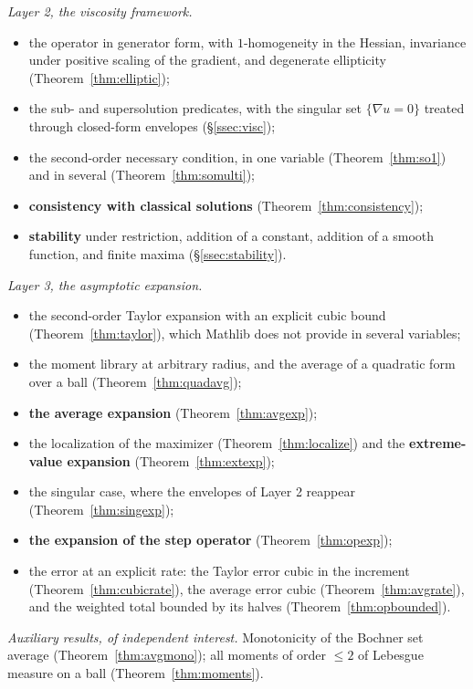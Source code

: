 \documentclass[11pt,reqno]{amsart}
\theoremstyle{plain}
\theoremstyle{definition}
\begin{document}
\emph{Layer 2, the viscosity framework.}
\begin{itemize}
  \item the operator in generator form, with $1$-homogeneity in the Hessian,
        invariance under positive scaling of the gradient, and degenerate
        ellipticity (Theorem~\ref{thm:elliptic});
  \item the sub- and supersolution predicates, with the singular set
        $\{\nabla u = 0\}$ treated through closed-form envelopes
        (\S\ref{ssec:visc});
  \item the second-order necessary condition, in one variable
        (Theorem~\ref{thm:so1}) and in several (Theorem~\ref{thm:somulti});
  \item \textbf{consistency with classical solutions}
        (Theorem~\ref{thm:consistency});
  \item \textbf{stability} under restriction, addition of a constant,
        addition of a smooth function, and finite maxima
        (\S\ref{ssec:stability}).
\end{itemize}

\emph{Layer 3, the asymptotic expansion.}
\begin{itemize}
  \item the second-order Taylor expansion with an explicit cubic bound
        (Theorem~\ref{thm:taylor}), which Mathlib does not provide in several
        variables;
  \item the moment library at arbitrary radius, and the average of a quadratic
        form over a ball (Theorem~\ref{thm:quadavg});
  \item \textbf{the average expansion} (Theorem~\ref{thm:avgexp});
  \item the localization of the maximizer (Theorem~\ref{thm:localize}) and the
        \textbf{extreme-value expansion} (Theorem~\ref{thm:extexp});
  \item the singular case, where the envelopes of Layer 2 reappear
        (Theorem~\ref{thm:singexp});
  \item \textbf{the expansion of the step operator}
        (Theorem~\ref{thm:opexp});
  \item the error at an explicit rate: the Taylor error cubic in the
        increment (Theorem~\ref{thm:cubicrate}), the average error cubic
        (Theorem~\ref{thm:avgrate}), and the weighted total bounded by its
        halves (Theorem~\ref{thm:opbounded}).
\end{itemize}

\emph{Auxiliary results, of independent interest.} Monotonicity of the Bochner
set average (Theorem~\ref{thm:avgmono}); all moments of order $\le 2$ of
Lebesgue measure on a ball (Theorem~\ref{thm:moments}).
\end{document}
